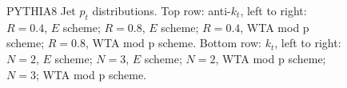 \begin{figure}[H]
\hfill
{}\hfill
\caption{PYTHIA8 Jet $p_t$ distributions. Top row: anti-$k_t$, left to right: $R=0.4$, $E$ scheme; $R=0.8$, $E$ scheme; $R=0.4$, WTA mod p scheme; $R=0.8$, WTA mod p scheme. Bottom row: $k_t$, left to right: $N=2$, $E$ scheme; $N=3$, $E$ scheme; $N=2$, WTA mod p scheme; $N=3$; WTA mod p scheme.}  
\end{figure}

